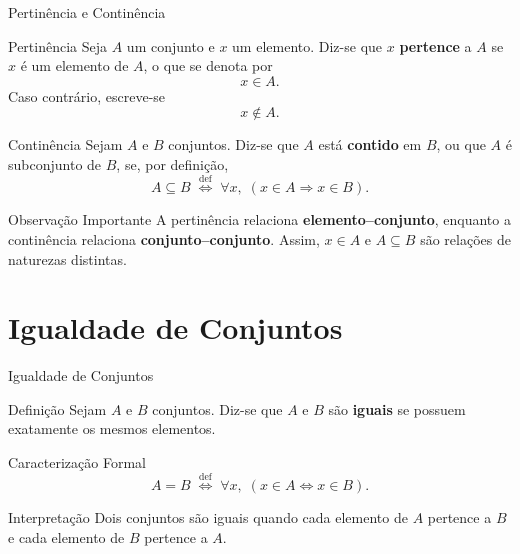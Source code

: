 \documentclass[9pt]{beamer}
\begin{document}
\begin{frame}{Pertinência e Continência}

\begin{block}{Pertinência}
Seja $A$ um conjunto e $x$ um elemento.
Diz-se que $x$ \textbf{pertence} a $A$ se $x$ é um elemento de $A$,
o que se denota por
\[
x \in A.
\]
Caso contrário, escreve-se
\[
x \notin A.
\]
\end{block}

\begin{block}{Continência}
Sejam $A$ e $B$ conjuntos.
Diz-se que $A$ está \textbf{contido} em $B$, ou que $A$ é subconjunto de $B$, se,
por definição,
\[
A \subseteq B \;\stackrel{\text{def}}{\Longleftrightarrow}\;
\forall x,\; (x \in A \Rightarrow x \in B).
\]
\end{block}

\begin{block}{Observação Importante}
A pertinência relaciona \textbf{elemento–conjunto}, enquanto a continência relaciona
\textbf{conjunto–conjunto}.
Assim, $x \in A$ e $A \subseteq B$ são relações de naturezas distintas.
\end{block}

\end{frame}

\section{Igualdade de Conjuntos}

\begin{frame}{Igualdade de Conjuntos}

\begin{block}{Definição}
Sejam $A$ e $B$ conjuntos.  
Diz-se que $A$ e $B$ são \textbf{iguais} se possuem exatamente os mesmos elementos.
\end{block}

\begin{block}{Caracterização Formal}
\[
A = B 
\;\stackrel{\text{def}}{\Longleftrightarrow}\;
\forall x,\; (x \in A \Leftrightarrow x \in B).
\]
\end{block}

\begin{block}{Interpretação}
Dois conjuntos são iguais quando cada elemento de $A$ pertence a $B$  
e cada elemento de $B$ pertence a $A$.
\end{block}

\end{frame}
 
\end{document}
